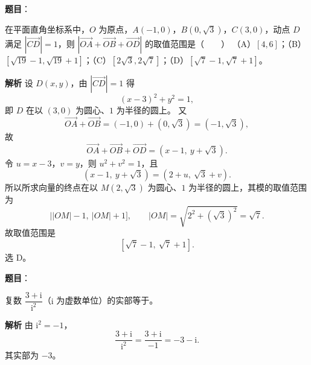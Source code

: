 \begin{answer}

\textbf{题目}：

在平面直角坐标系中，$O$ 为原点，$A(-1,0)$，$B(0,\sqrt3)$，$C(3,0)$，动点 $D$ 满足 $|\overrightarrow{CD}|=1$，则 $|\overrightarrow{OA}+\overrightarrow{OB}+\overrightarrow{OD}|$ 的取值范围是\mbox{（　　）}
（A）$[4,6]$；（B）$[\sqrt{19}-1,\sqrt{19}+1]$；（C）$[2\sqrt3,2\sqrt7]$；（D）$[\sqrt7-1,\sqrt7+1]$。

\textbf{解析}
设 $D(x,y)$，由 $|\overrightarrow{CD}|=1$ 得
\nopagebreak[4]
\[(x-3)^2+y^2=1,\]
即 $D$ 在以 $(3,0)$ 为圆心、$1$ 为半径的圆上。
又
\nopagebreak[4]
\[\overrightarrow{OA}+\overrightarrow{OB}=(-1,0)+(0,\sqrt3)=(-1,\sqrt3),\]
故
\nopagebreak[4]
\[\overrightarrow{OA}+\overrightarrow{OB}+\overrightarrow{OD}=(x-1,\ y+\sqrt3).\]
令 $u=x-3$，$v=y$，则 $u^2+v^2=1$，且
\nopagebreak[4]
\[(x-1,\ y+\sqrt3)=(2+u,\ \sqrt3+v).\]
所以所求向量的终点在以 $M(2,\sqrt3)$ 为圆心、$1$ 为半径的圆上，其模的取值范围为
\nopagebreak[4]
\[\bigl||OM|-1,\ |OM|+1\bigr],\qquad |OM|=\sqrt{2^2+(\sqrt3)^2}=\sqrt7 .\]
故取值范围是
\nopagebreak[4]
\[[\sqrt7-1,\ \sqrt7+1].\]
选 D。


\end{answer}
\begin{answer}

\textbf{题目}：

复数 $\dfrac{3+\mathrm i}{\mathrm i^2}$（$\mathrm i$ 为虚数单位）的实部等于\gkblank{}。

\textbf{解析}
由 $\mathrm i^2=-1$，
\nopagebreak[4]
\[\frac{3+\mathrm i}{\mathrm i^2}=\frac{3+\mathrm i}{-1}=-3-\mathrm i .\]
其实部为 $-3$。


\end{answer}
